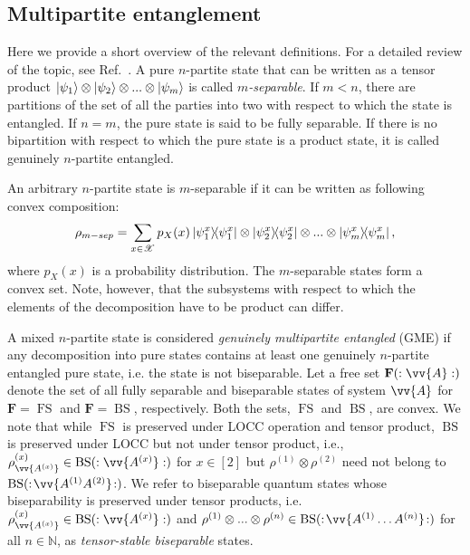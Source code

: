 \documentclass[aps,pra,twocolumn,superscriptaddress,longbibliography]{revtex4-1}
\def\FS{\operatorname{FS}}
\def\BS{\operatorname{BS}}
\newcommand{\tf}[1]{\textbf{#1}}
\newcommand{\msc}[1]{\mathscr{#1}}
\begin{document}
\subsection{Multipartite entanglement}\label{sec:ME}
Here we provide a short overview of the relevant definitions. For a detailed review of the topic, see Ref.~\cite{friis2019entanglement}. A pure $n$-partite state that can be written as a tensor product $\ket{\psi_1}\otimes\ket{\psi_2}\otimes...\otimes\ket{\psi_m}$ is called \textit{$m$-separable}. If $m<n$, there are partitions of the set of all the parties into two with respect to which the state is entangled. If $n=m$, the pure state is said to be fully separable. If there is no bipartition with respect to which the pure state is a product state, it is called genuinely $n$-partite entangled.

An arbitrary $n$-partite state is $m$-separable if it can be written as following convex composition:
\begin{equation}
\rho_{m-sep}=\sum_{x\in\msc{X}} p_X(x) \op{\psi^x_1}\otimes\op{\psi^x_2} \otimes...\otimes\op{\psi^x_m},
\end{equation}
where $p_X(x)$ is a probability distribution. 
The $m$-separable states form a convex set. Note, however, that the subsystems with respect to which the elements of the decomposition have to be product can differ. %

A  mixed $n$-partite state is considered \textit{genuinely multipartite entangled} (GME) if any decomposition into pure states contains at least one genuinely $n$-partite entangled pure state, i.e. the state is not biseparable. Let a free set $\tf{F}(:\vv{A}:)$ denote the set of all fully separable and biseparable states of system $\vv{A}$ for $\tf{F}=\FS$ and $\tf{F}=\BS$, respectively. Both the sets, $\FS$ and $\BS$, are convex. We note that while $\FS$ is preserved under LOCC operation and tensor product, $\BS$ is preserved under LOCC but not under tensor product, i.e., $\rho^{(x)}_{\vv{A^{(x)}}}\in\BS(:\vv{A^{(x)}}:)$ for $x\in[2]$ but $\rho^{(1)}\otimes\rho^{(2)}$ need not belong to $\BS(:\!\vv{A^{(1)}A^{(2)}}\!:)$. We refer to biseparable quantum states whose biseparability is preserved under tensor products, i.e. $\rho^{(x)}_{\vv{A^{(x)}}}\in\BS(:\vv{A^{(x)}}:)$ and $\rho^{(1)}\otimes...\otimes\rho^{(n)}\in\BS(:\!\vv{A^{(1)}\ldots A^{(n)}}\!:)$ for all $n\in\mathbb{N}$, as \textit{tensor-stable biseparable} states. %
\end{document}
